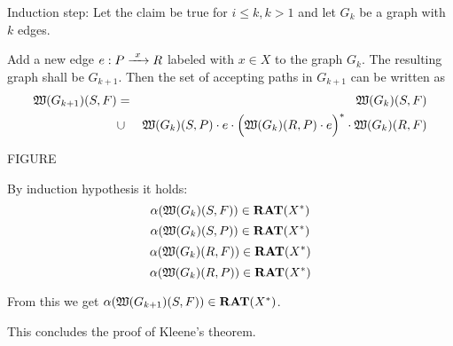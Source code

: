 Induction step: Let the claim be true for $i \leq k, k > 1$ and let $G_k$ be a
graph with $k$ edges.

Add a new edge $e : P \xrightarrow{\ {x}\ } R$ labeled with $x \in X$ to the graph $G_k$. The
resulting graph shall be $G_{k+1}$. Then the set of accepting paths in $G_{k+1}$
can be written as \begin{eqnarray*}
 \mbox{$\mathfrak{W}(G_{k+1})$}(S, F) & = & \mbox{$\mathfrak{W}(G_k)$}(S, F) \\
 & \cup & \mbox{$\mathfrak{W}(G_k)$}(S, P) \cdot e \cdot \Big( \mbox{$\mathfrak{W}(G_k)$}(R, P) \cdot
 e \Big)^* \cdot \mbox{$\mathfrak{W}(G_k)$}(R, F)
\end{eqnarray*}

FIGURE

By induction hypothesis it holds:
\[ \alpha(\mbox{$\mathfrak{W}(G_k)$}(S, F)) \in \mbox{{\bf RAT}}(X^*) \]
\[ \alpha(\mbox{$\mathfrak{W}(G_k)$}(S, P)) \in \mbox{{\bf RAT}}(X^*) \]
\[ \alpha(\mbox{$\mathfrak{W}(G_k)$}(R, F)) \in \mbox{{\bf RAT}}(X^*) \]
\[ \alpha(\mbox{$\mathfrak{W}(G_k)$}(R, P)) \in \mbox{{\bf RAT}}(X^*) \]

From this we get $\alpha(\mbox{$\mathfrak{W}(G_{k+1})$}(S, F)) \in \mbox{{\bf RAT}}(X^*)$.

This concludes the proof of Kleene's theorem.



























